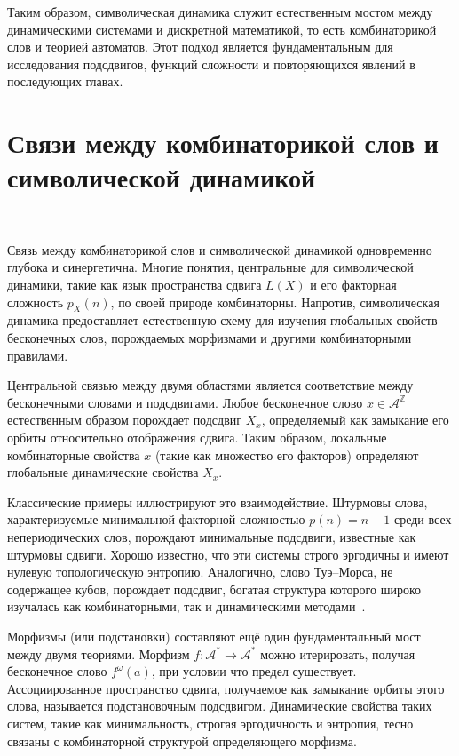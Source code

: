 \documentclass[a4paper,14pt]{extreport}
\theoremstyle{plain}
\theoremstyle{definition}
\theoremstyle{remark}
\begin{document}
Таким образом, символическая динамика служит естественным мостом между динамическими системами и дискретной математикой, то есть комбинаторикой слов и теорией автоматов. Этот подход является фундаментальным для исследования подсдвигов, функций сложности и повторяющихся явлений в последующих главах.
\section{Связи между комбинаторикой слов и символической динамикой}~\label{sec1.4}

Связь между комбинаторикой слов и символической динамикой одновременно глубока и синергетична. Многие понятия, центральные для символической динамики, такие как язык пространства сдвига $L(X)$ и его факторная сложность $p_X(n)$, по своей природе комбинаторны. Напротив, символическая динамика предоставляет естественную схему для изучения глобальных свойств бесконечных слов, порождаемых морфизмами и другими комбинаторными правилами.

Центральной связью между двумя областями является соответствие между бесконечными словами и подсдвигами. Любое бесконечное слово $x \in \mathcal{A}^{\mathbb{Z}}$ естественным образом порождает подсдвиг $X_x$, определяемый как замыкание его орбиты относительно отображения сдвига. Таким образом, локальные комбинаторные свойства $x$ (такие как множество его факторов) определяют глобальные динамические свойства $X_x$.

Классические примеры иллюстрируют это взаимодействие. Штурмовы слова, характеризуемые минимальной факторной сложностью $p(n) = n+1$ среди всех непериодических слов, порождают минимальные подсдвиги, известные как штурмовы сдвиги. Хорошо известно, что эти системы строго эргодичны и имеют нулевую топологическую энтропию. Аналогично, слово Туэ--Морса, не содержащее кубов, порождает подсдвиг, богатая структура которого широко изучалась как комбинаторными, так и динамическими методами~\cite{Allouche}.

Морфизмы (или подстановки) составляют ещё один фундаментальный мост между двумя теориями. Морфизм $f: \mathcal{A}^* \to \mathcal{A}^*$ можно итерировать, получая бесконечное слово $f^\omega(a)$, при условии что предел существует. Ассоциированное пространство сдвига, получаемое как замыкание орбиты этого слова, называется подстановочным подсдвигом. Динамические свойства таких систем, такие как минимальность, строгая эргодичность и энтропия, тесно связаны с комбинаторной структурой определяющего морфизма.
\end{document}
